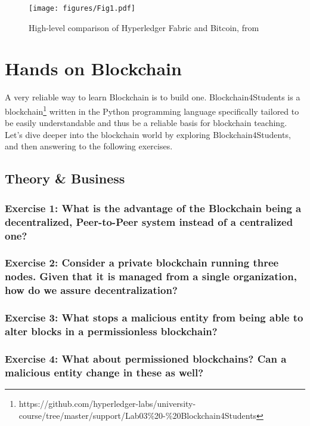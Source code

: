 \documentclass[12pt,a4paper]{article}
\theoremstyle{definition}
\begin{document}
\begin{figure}
\centering
\texttt{[image: figures/Fig1.pdf]}
\caption{High-level comparison of Hyperledger Fabric and Bitcoin, from \cite{belchior2020survey}}
\label{fig:bcs}
\end{figure}



\section{Hands on Blockchain}

A very reliable way to learn Blockchain is to build one. Blockchain4Students is a blockchain\footnote{https://github.com/hyperledger-labs/university-course/tree/master/support/Lab03\%20-\%20Blockchain4Students} written in the Python programming language specifically tailored to be easily understandable and thus be a reliable basis for blockchain teaching. Let's dive deeper into the blockchain world by exploring Blockchain4Students, and then answering to the following exercises.


\subsection{Theory \& Business}


\subsubsection*{Exercise 1: What is the advantage of the Blockchain being a decentralized, Peer-to-Peer system instead of a centralized one?}

\subsubsection*{Exercise 2: Consider a private blockchain running three nodes. Given that it is managed from a single organization, how do we assure decentralization?}

\subsubsection*{Exercise 3: What stops a malicious entity from being able to alter blocks in a permissionless blockchain?}

\subsubsection*{Exercise 4: What about permissioned blockchains? Can a malicious entity change in these as well?}
\end{document}
